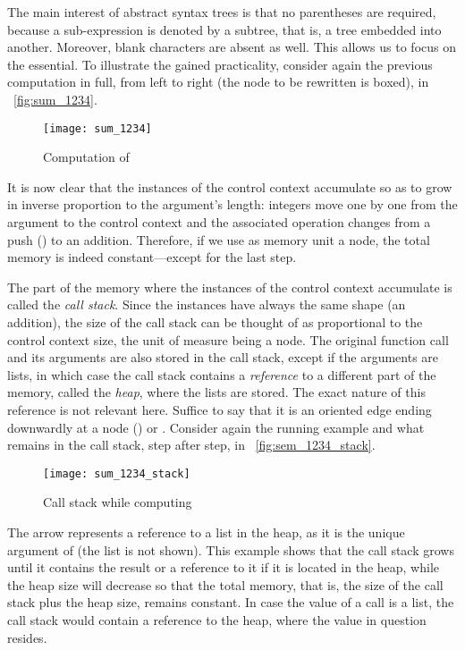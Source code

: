 The main interest of abstract syntax trees is that no parentheses are
required, because a sub\hyp{}expression is denoted by a subtree, that
is, a tree embedded into another. Moreover, blank characters are
absent as well. This allows us to focus on the essential. To
illustrate the gained practicality, consider again the previous
computation in full, from left to right (the node to be rewritten is
boxed), in \fig~\vref{fig:sum_1234}.
\begin{figure}[t]
\centering
\texttt{[image: sum\_1234]}
\caption{Computation of \label{fig:sum_1234}}
\end{figure}
It is now clear that the instances of the control context accumulate
so as to grow in inverse proportion to the argument's length: integers
move one by one from the argument to the control context and the
associated operation changes from a push (\erlcode{|}) to an
addition. Therefore, if we use as memory unit a node, the total memory
is indeed constant---except for the last step.

\label{def:call_stack_heap}
The part of the memory where the instances of the control context
accumulate is called the \emph{call stack}. Since the instances have
always the same shape (an addition), the size of the call stack can be
thought of as proportional to the control context size, the unit of
measure being a node. The original function call and its arguments are
also stored in the call stack, except if the arguments are lists, in
which case the call stack contains a \emph{reference} to a different
part of the memory, called the \emph{heap}, where the lists are
stored. The exact nature of this reference is not relevant
here. Suffice to say that it is an oriented edge ending downwardly at
a node (\erlcode{|}) or \erlcode{[]}. Consider again the running
example and what remains in the call stack, step after step, in
\fig~\vref{fig:sem_1234_stack}.
\begin{figure}[b]
\centering
\texttt{[image: sum\_1234\_stack]}
\caption{Call stack while computing 
\label{fig:sem_1234_stack}}
\end{figure}
The arrow represents a reference to a list in the heap, as it is the
unique argument of  (the list is not shown). This
example shows that the call stack grows until it contains the result
or a reference to it if it is located in the heap, while the heap size
will decrease so that the total memory, that is, the size of the call
stack plus the heap size, remains constant. In case the value of a
call is a list, the call stack would contain a reference to the heap,
where the value in question resides.


